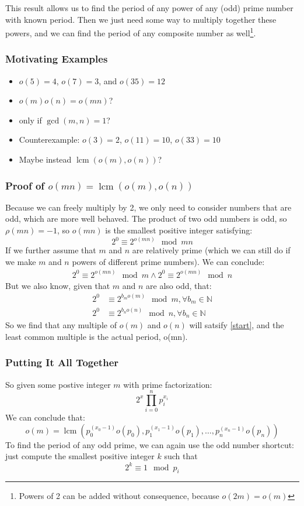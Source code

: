 \documentclass{article}
\DeclareMathOperator{\lcm}{lcm}
\begin{document}
  This result allows us to find the period  of any power of any (odd) prime number with known period. Then we just need some way to multiply together these powers, and we can find the period of any composite number as well\footnote{Powers of 2 can be added without consequence, because $o(2m) = o(m)$}.
  \subsubsection{Motivating Examples}
  \begin{itemize}
  \item $o(5) = 4$, $o(7) = 3$, and $o(35) = 12$
  \item $o(m)o(n) = o(mn)$?
  \item only if $\gcd(m, n) = 1$?
  \item Counterexample: $o(3) = 2$, $o(11) = 10$, $o(33) = 10$
  \item Maybe instead $\lcm(o(m), o(n))$? 
  \end{itemize}
  \subsubsection{Proof of $o(mn) = \lcm(o(m), o(n))$}
  Because we can freely multiply by 2, we only need to consider numbers that are odd, which are more well behaved. The product of two odd numbers is odd, so $\rho(mn) = -1$, so $o(mn)$ is the smallest positive integer satisfying:
  \begin{equation}\label{start}
    2^0 \equiv 2^{o(mn)} \mod mn
  \end{equation}
  If we further assume that $m$ and $n$ are relatively prime (which we can still do if we make $m$ and $n$ powers of different prime numbers). We can conclude:
  \begin{align}
    2^0 \equiv 2^{o(mn)} \mod m \land 2^0 \equiv 2^{o(mn)} \mod n
  \end{align}
  But we also know, given that $m$ and $n$ are also odd, that:
  \begin{align}
    2^0 &\equiv 2^{b_mo(m)} \mod m, \forall b_m \in \mathbb{N}\\
    2^0 &\equiv 2^{b_no(n)} \mod n, \forall b_n \in \mathbb{N}
  \end{align}
  So we find that any multiple of $o(m)$ and $o(n)$ will satsify \eqref{start}, and the least common multiple is the actual period, o(mn).
  \subsubsection{Putting It All Together}
  So given some postive integer $m$ with prime factorization:
  \begin{equation}
    2^x\prod^n_{i=0}p_i^{x_i}
  \end{equation}
  We can conclude that:
  \begin{equation}
    o(m) = \lcm(p_0^{(x_0-1)}o(p_0), p_1^{(x_1-1)}o(p_1), \dots, p_n^{(x_n-1)}o(p_n))
  \end{equation}
  To find the period of any odd prime, we can again use the odd number shortcut: just compute the smallest positive integer $k$ such that
  \begin{equation}
    2^k \equiv 1 \mod p_i
  \end{equation}
\end{document}
